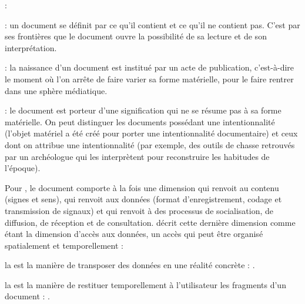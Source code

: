 \begin{liste}
	\item {} :  

	\item {} : un document se définit par ce qu'il contient et ce qu'il ne contient pas.
	C'est par ses frontières que le document ouvre la possibilité de sa lecture et de son interprétation.

	\item {} : la naissance d'un document est institué par un acte de publication, c'est-à-dire le moment où l'on arrête de faire varier sa forme matérielle, pour le faire rentrer dans une sphère médiatique.

	\item {} : le document est porteur d'une signification qui ne se résume pas à sa forme matérielle.
	On peut distinguer les documents possédant une intentionnalité  (l'objet matériel a été créé pour porter une intentionnalité documentaire) et ceux dont on attribue une intentionnalité  (par exemple, des outils de chasse retrouvés par un archéologue qui les interprètent pour reconstruire les habitudes de l'époque).
\end{liste}


Pour \cite{Leleu-Merviel2004}, le document comporte à la fois une dimension  qui renvoit au contenu (signes et sens),  qui renvoit aux données (format d'enregistrement, codage et transmission de signaux) et  qui renvoit à des processus de socialisation, de diffusion, de réception et de consultation.
\cite{Leleu-Merviel2005} décrit cette dernière dimension comme étant la dimension d'accès aux données, un accès qui peut être organisé spatialement et temporellement :
\begin{liste}
	\item la  est la manière de transposer des données en une réalité concrète : . %
	\item la  est la manière de restituer temporellement à l'utilisateur les fragments d'un document : . %
\end{liste}

